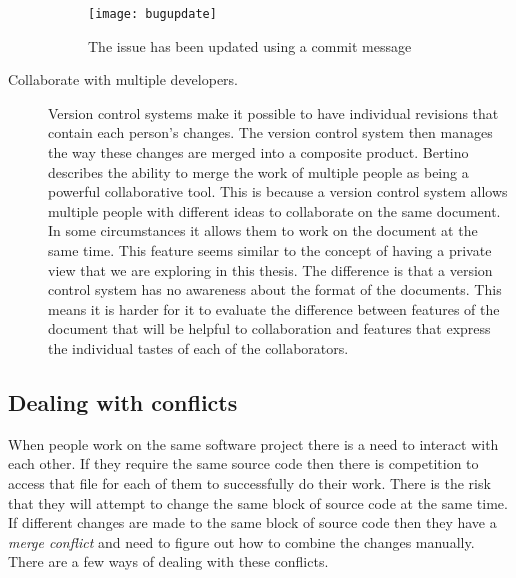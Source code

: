 \begin{description}
  \begin{figure}[!t]
   \begin{center}
    \texttt{[image: bugupdate]}
   \end{center}
   \caption{The issue has been updated using a commit message}
   \label{fig:bgBugUpdate}
  \end{figure}

  \item [Collaborate with multiple developers.]
  Version control systems make it possible to have individual revisions that contain each person's changes. 
  The version control system then manages the way these changes are merged into a composite product. 
  Bertino \cite{Bertino2012} describes the ability to merge the work of multiple people as being a powerful collaborative tool. 
  This is because a version control system allows multiple people with different ideas to collaborate on the same document. 
  In some circumstances it allows them to work on the document at the same time. This feature seems similar to the concept of having a private view that we are exploring in this thesis. The difference is that a version control system has no awareness about the format of the documents. This means it is harder for it to evaluate the difference between features of the document that will be helpful to collaboration and features that express the individual tastes of each of the collaborators.

\end{description}



\subsection{Dealing with conflicts}
When people work on the same software project there is a need to interact with each other.
If they require the same source code then there is competition to access that file for each of them to successfully do their work.
There is the risk that they will attempt to change the same block of source code at the same time.
If different changes are made to the same block of source code then they have a \emph{merge conflict} and need to figure out how to combine the changes manually.
There are a few ways of dealing with these conflicts.

